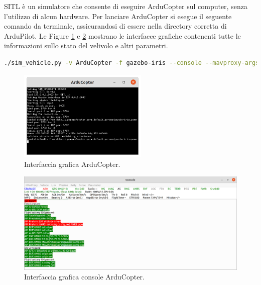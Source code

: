 \ac{SITL} è un simulatore che consente di eseguire ArduCopter sul computer, senza l'utilizzo di alcun hardware. Per lanciare ArduCopter si esegue il seguente comando da terminale, assicurandosi di essere nella directory corretta di ArduPilot. Le Figure \ref{fig:arduCopter} e \ref{fig:consArduCopter} mostrano le interfacce grafiche contenenti tutte le informazioni sullo stato del velivolo e altri parametri.\\

\begin{lstlisting}[language=bash]
  ./sim_vehicle.py -v ArduCopter -f gazebo-iris --console --mavproxy-args="--streamrate=100"
\end{lstlisting}

\begin{figure}[H]
	\centering
	\includegraphics[width=0.55\textwidth]{gfx/ROS/ArduCopter}
	\caption[Interfaccia grafica ArduCopter.]{Interfaccia grafica ArduCopter.}
	\label{fig:arduCopter}
\end{figure}

\begin{figure}[H]
	\centering
	\includegraphics[width=1\textwidth]{gfx/ROS/SITL}
	\caption[Interfaccia grafica console ArduCopter.]{Interfaccia grafica console ArduCopter.}
	\label{fig:consArduCopter}
\end{figure}

